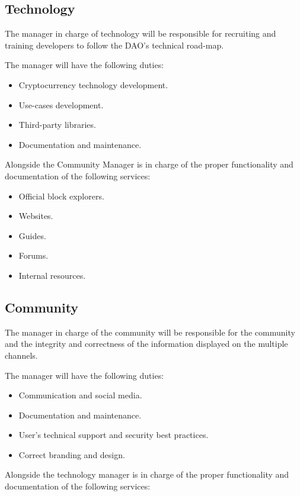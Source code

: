 \documentclass{article}
\begin{document}
\subsection{Technology}

The manager in charge of technology will be responsible for recruiting and training developers to follow the DAO's technical road-map.

The manager will have the following duties:

\begin{itemize}
  \item Cryptocurrency technology development.
  \item Use-cases development.
  \item Third-party libraries.
  \item Documentation and maintenance.
\end{itemize}

Alongside the Community Manager is in charge of the proper functionality and documentation of the following services:

\begin{itemize}
  \item Official block explorers.
  \item Websites.
  \item Guides.
  \item Forums.
  \item Internal resources.
\end{itemize}

\subsection{Community}

The manager in charge of the community will be responsible for the community and the integrity and correctness of the information displayed on the multiple channels.

The manager will have the following duties:

\begin{itemize}
  \item Communication and social media.
  \item Documentation and maintenance.
  \item User's technical support and security best practices.
  \item Correct branding and design.
\end{itemize}

Alongside the technology manager is in charge of the proper functionality and documentation of the following services:
\end{document}
